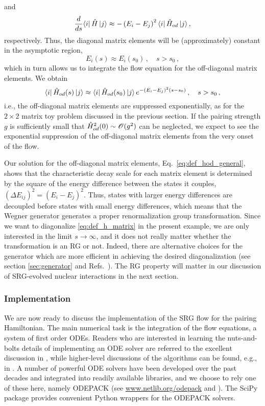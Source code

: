 and
\begin{align}
   \frac{d {}} {d {s}} \langle{i}|\,{\hat{H}}\,|{j}\rangle
  \approx-\left(E_i-E_j\right)^2\langle{i}|\,{\hat{H}_{od}}\,|{j}\rangle\,,
\end{align}
respectively. Thus, the diagonal matrix elements will be (approximately)
constant in the asymptotic region,
\begin{equation}
  E_i(s) \approx E_i(s_0)\,,\quad s>s_0\,,
\end{equation}
which in turn allows us to integrate the flow equation for the off-diagonal
matrix elements. We obtain
\begin{equation}\label{eq:def_hod_general}
  \matrixe{i}{\HO_{od}(s)}{j} \approx \matrixe{i}{\HO_{od}(s_0)}{j}\,e^{-(E_i-E_j)^2 (s-s_0)}\,, \quad s>s_0\,,
\end{equation}
i.e., the off-diagonal matrix elements are suppressed exponentially, as for the
$2\times2$ matrix toy problem discussed in the previous section. If the pairing
strength $g$ is sufficiently small that $\hat{H}^2_{od}(0)\sim \mathcal{O}(g^2)$ can 
be neglected, we expect to see the exponential suppression of the off-diagonal 
matrix elements from the very onset of the flow. 

Our solution for the off-diagonal matrix elements, Eq.~\eqref{eq:def_hod_general},
shows that the characteristic decay scale for each matrix element is determined 
by the square of the energy difference between the states it couples, 
$(\Delta E_{ij})^2 = (E_i-E_j)^2$. Thus, states with larger energy differences
are decoupled before states with small energy differences, which means that 
the Wegner generator generates a proper renormalization group transformation.
Since we want to diagonalize \eqref{eq:def_h_matrix} in the present example,
we are only interested in the limit $s\to\infty$, and it does not really matter
whether the transformation is an RG or not. Indeed, there are alternative choices
for the generator which are more efficient in achieving the desired diagonalization
(see section \ref{sec:generator} and Refs.~\cite{Hergert:2016jk,Hergert:2016ng}).
The RG property will matter in our discussion of SRG-evolved nuclear interactions 
in the next section.

\subsubsection{Implementation}
We are now ready to discuss the implementation of the SRG flow for the pairing
Hamiltonian. The main numerical task is the integration of the flow equations,
a system of first order ODEs. Readers who are interested in learning the 
nuts-and-bolts details of implementing an ODE solver are referred to the excellent 
discussion in \cite{Press:2007vn}, while higher-level discussions of the algorithms
can be found, e.g., in \cite{Shampine:1975qq,Landau:2012zr,Hjorth-Jensen:2015mz}.
A number of powerful ODE solvers have been developed over the past decades and 
integrated into readily available libraries, and we choose to rely one of these 
here, namely ODEPACK (see \url{www.netlib.org/odepack} and 
\cite{Hindmarsh:1983pd,Radhakrishnan:1993fk,Brown:1989qd}). The SciPy package
provides convenient Python wrappers for the ODEPACK solvers.

